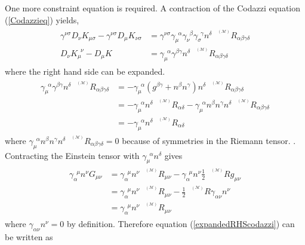 \documentclass[11pt]{article}
\newcommand{\blank}{\enspace}
\newcommand{\sttensor}{\text{ }{\scriptscriptstyle ^{^{(\mathcal{M})}}}}
\numberwithin{equation}{section}
\begin{document}
One more constraint equation is required. A contraction of the Codazzi equation (\ref{Codazzieq}) yields, 
\begin{align}
\begin{split}
    \gamma^{\nu\sigma}D_{\nu}K_{\mu\sigma} - \gamma^{\nu\sigma}D_{\mu}K_{\nu\sigma} &= \gamma^{\nu\sigma} \gamma_{\mu}^{\blank\alpha} \gamma_{\nu}^{\blank\beta} \gamma_{\sigma}^{\blank\gamma} n^{\delta} \sttensor R_{\alpha\beta\gamma\delta} \\ 
    D_{\nu}K_{\mu}^{\blank\nu} - D_{\mu}K&= \gamma_{\mu}^{\blank\alpha} \gamma^{\beta\gamma} n^{\delta} \sttensor R_{\alpha\beta\gamma\delta} \label{contractedcodazzi}
\end{split}
\end{align}
where the right hand side can be expanded.
\begin{align} \label{expandedRHScodazzi}
    \begin{split}
    \gamma_{\mu}^{\blank\alpha} \gamma^{\beta\gamma} n^{\delta} \sttensor R_{\alpha\beta\gamma\delta} &= -\gamma_{\mu}^{\blank\alpha}(g^{\beta\gamma} + n^{\beta}n^{\gamma}) n^{\delta}\sttensor R_{\alpha\beta\gamma\delta} \\ 
    &= -\gamma_{\mu}^{\blank\alpha} n^{\delta} \sttensor R_{\alpha\delta} - \gamma_{\mu}^{\blank\alpha}n^{\beta}n^{\gamma}n^{\delta} \sttensor R_{\alpha\beta\gamma\delta} \\
    &= -\gamma_{\mu}^{\blank\alpha}n^{\delta} \sttensor R_{\alpha\delta}
    \end{split}
\end{align}
where $\gamma_{\mu}^{\blank\alpha}n^{\beta}n^{\gamma}n^{\delta} \sttensor R_{\alpha\beta\gamma\delta} = 0$ because of symmetries in the Riemann tensor. \cite{baumgarte_shapiro_2010}. Contracting the Einstein tensor with $\gamma_{\mu}^{\blank\alpha}n^{\delta}$ gives
\begin{align}
    \begin{split}
    \gamma_{\alpha}^{\blank\mu}n^{\nu} G_{\mu\nu} &= \gamma_{\alpha}^{\blank\mu}n^{\nu} \sttensor R_{\mu\nu} - \gamma_{\alpha}^{\blank\mu}n^{\nu} \frac12 \sttensor R g_{\mu\nu} \\ &= \gamma_{\alpha}^{\blank\mu}n^{\nu} \sttensor R_{\mu\nu} - \frac12 \sttensor R \gamma_{\alpha\nu}n^{\nu} \\ 
    &= \gamma_{\alpha}^{\blank\mu}n^{\nu} \sttensor R_{\mu\nu}
    \end{split}
\end{align}
where $\gamma_{\alpha\nu}n^{\nu} = 0$ by definition. Therefore equation (\ref{expandedRHScodazzi}) can be written as 
\end{document}
